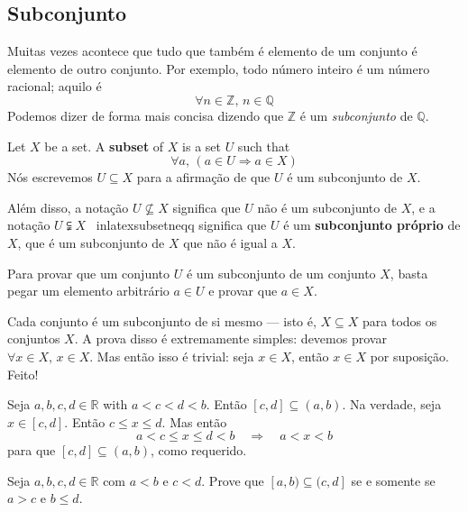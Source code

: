 \subsection*{Subconjunto}

Muitas vezes acontece que tudo que também é elemento de um conjunto é elemento de outro conjunto. Por exemplo, todo número inteiro é um número racional; aquilo é
\[ \forall n \in \mathbb{Z},\, n \in \mathbb{Q} \]
Podemos dizer de forma mais concisa dizendo que $\mathbb{Z}$ é um \textit{subconjunto} de $\mathbb{Q}$.

\begin{definition}
\label{defSubset}
Let $X$ be a set. A \textbf{subset} of $X$ is a set $U$ such that
\[ \forall a,\, (a \in U \Rightarrow a \in X) \]
Nós escrevemos $U \subseteq X$  para a afirmação de que $U$ é um subconjunto de $X$.

Além disso, a notação $U \nsubseteq X$  significa que $U$ não é um subconjunto de $X$, e a notação $U \subsetneqq X$ \ inlatex{subsetneqq} significa que $U$ é um \textbf{subconjunto próprio} de $X$, que é um subconjunto de $X$ que não é igual a $X$.
\end{definition}

\begin{strategy}
Para provar que um conjunto $U$ é um subconjunto de um conjunto $X$, basta pegar um elemento arbitrário $a \in U$ e provar que $a \in X$.
\end{strategy}

\begin{example}
Cada conjunto é um subconjunto de si mesmo --- isto é, $X \subseteq X$ para todos os conjuntos $X$. A prova disso é extremamente simples: devemos provar $\forall x \in X,\, x \in X$. Mas então isso é trivial: seja $x \in X$, então $x \in X$ por suposição. Feito!
\end{example}

\begin{example}
Seja $a,b,c,d \in \mathbb{R}$ with $a<c<d<b$. Então $[c,d] \subseteq (a,b)$. Na verdade, seja $x \in [c,d]$. Então $c \le x \le d$. Mas então
\[ a < c \le x \le d < b \quad \Rightarrow \quad a < x < b \]
para que $[c,d] \subseteq (a,b)$, como requerido.
\end{example}

\begin{exercise}
Seja $a,b,c,d \in \mathbb{R}$ com $a<b$ e $c<d$. Prove que $[a,b) \subseteq (c,d]$ se e somente se $a > c$ e $b \le d$.
\end{exercise}

